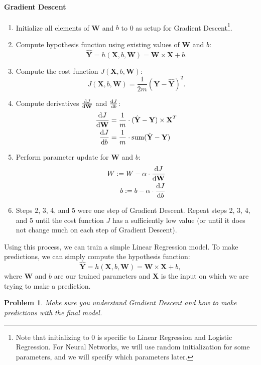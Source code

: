 \documentclass{article}
\newtheorem*{problem}{Problem}
\begin{document}
\paragraph{Gradient Descent}
\begin{enumerate}
    \item Initialize all elements of \textbf{W} and $b$ to 0 as setup for Gradient Descent\footnote{Note that initializing to 0 is specific to Linear Regression and Logistic Regression. For Neural Networks, we will use random initialization for some parameters, and we will specify which parameters later.}.
    \item Compute hypothesis function using existing values of \textbf{W} and $b$: 
    \[\hat{\textbf{Y}}=h(\textbf{X},b,\textbf{W})=\textbf{W}\times \textbf{X} + b.\]
    \item Compute the cost function $J(\textbf{X},b,\textbf{W})$:
    \[J(\textbf{X},b,\textbf{W})=\frac{1}{2m} (\textbf{Y}-\hat{\textbf{Y}})^2.\]
    \item Compute derivatives $\diff{J}{\textbf{W}}$ and $\diff{J}{b}$:
    \begin{align*}
        \diff{J}{\textbf{W}}&=\frac{1}{m}\cdot (\hat{\textbf{Y}}-\textbf{Y})\times \textbf{X}^T\\
        \diff{J}{b}&=\frac{1}{m}\cdot \text{sum}(\hat{\textbf{Y}}-\textbf{Y})\\
    \end{align*}
    \item Perform parameter update for \textbf{W} and $b$:
    \begin{align*}
        W:=W-\alpha\cdot \diff{J}{\textbf{W}}\\
        b:=b-\alpha\cdot \diff{J}{b}\\
    \end{align*}
    \item Steps 2, 3, 4, and 5 were one step of Gradient Descent. Repeat steps 2, 3, 4, and 5 until the cost function $J$ has a sufficiently low value (or until it does not change much on each step of Gradient Descent).
\end{enumerate}
Using this process, we can train a simple Linear Regression model. To make predictions, we can simply compute the hypothesis function:
\[\hat{\textbf{Y}}=h(\textbf{X},b,\textbf{W})=\textbf{W}\times \textbf{X} + b,\]
where \textbf{W} and $b$ are our trained parameters and \textbf{X} is the input on which we are trying to make a prediction.
\begin{problem}
Make sure you understand Gradient Descent and how to make predictions with the final model. 
\end{problem}
\end{document}

